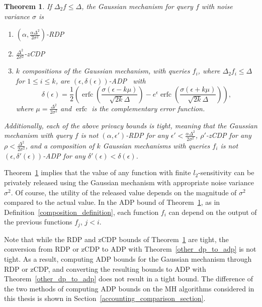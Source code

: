 \documentclass[english,twoside,openright]{HYgraduMLDS}
\newtheorem{theorem}[lemma]{Theorem}
\DeclareMathOperator{\erfc}{erfc}
\begin{document}
\begin{theorem}\label{gauss-DP-bounds}
  If \(\Delta_{2}f \leq \Delta\), the Gaussian mechanism for query \(f\) with
  noise variance \(\sigma\) is
    \begin{enumerate}
        \item 
            \((\alpha, \frac{\alpha \Delta^2}{2\sigma^2})\)-RDP~\cite{Mironov17}
        \item 
            \(\frac{\Delta^2}{2\sigma^2}\)-zCDP~\cite{BuS16}
        \item 
            \(k\) compositions of the Gaussian mechanism, with
            queries \(f_{i}\), where \(\Delta_{2}f_{i}\leq \Delta\) for
            \(1\leq i \leq k\), are
            \((\epsilon, \delta(\epsilon))\)-ADP~\cite{Sommer2019} with 
            \[
                \delta(\epsilon) 
                = \frac{1}{2}\left(
                    \erfc\left(\frac{\sigma(\epsilon - k\mu)}{\sqrt{2k}\Delta}\right)
                    - e^\epsilon \erfc\left(\frac{\sigma(\epsilon + k\mu)}{\sqrt{2k}\Delta}\right)
                \right),
            \]
            where \(\mu = \frac{\Delta^2}{2\sigma^2}\) and \(\erfc\) is 
            the complementary error function.
    \end{enumerate}
    Additionally, each of the above privacy bounds is tight, meaning that
    the Gaussian mechanism with query \(f\) is not \((\alpha, \epsilon')\)-RDP
    for any \(\epsilon' < \frac{\alpha\Delta^{2}}{2\sigma^{2}}\), \(\rho'\)-zCDP
    for any \(\rho < \frac{\Delta^{2}}{2\sigma^{2}}\), and a composition
    of \(k\) Gaussian mechanisms with queries \(f_{i}\) is not
    \((\epsilon, \delta'(\epsilon))\)-ADP for any
    \(\delta'(\epsilon) < \delta(\epsilon)\).
\end{theorem}

Theorem~\ref{gauss-DP-bounds} implies that the value of any function with
finite \(l_2\)-sensitivity can be privately released using the Gaussian mechanism
with appropriate noise variance \(\sigma^2\). Of course, the utility of the
released value depends on the magnitude of \(\sigma^2\) compared to the actual
value. In the ADP bound of Theorem~\ref{gauss-DP-bounds},
as in Definition~\ref{composition_definition}, each function \(f_{i}\)
can depend on the output of the previous functions \(f_{j}\), \(j < i\).

Note that while the RDP and zCDP bounds of Theorem~\ref{gauss-DP-bounds} are
tight, the conversion from RDP or zCDP to ADP with Theorem~\ref{other_dp_to_adp}
is not tight. As a result, computing
ADP bounds for the Gaussian mechanism through RDP or zCDP, and converting
the resulting bounds to ADP with Theorem~\ref{other_dp_to_adp} does not
result in a tight bound. The difference of the two methods of computing ADP bounds
on the MH algorithms considered in this thesis is shown in
Section~\ref{accounting_comparison_section}.
\end{document}
